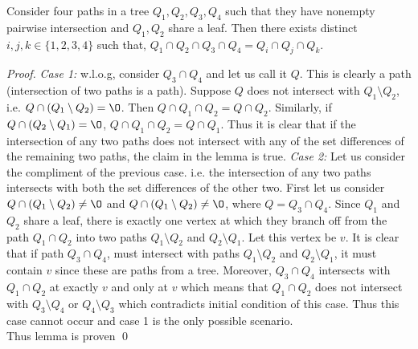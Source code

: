 \documentclass{llncs}
\begin{document}
\begin{lemma}
  \label{lem:fourpaths} Consider four paths in a tree $Q_1, Q_2, Q_3,
  Q_4$ such that they have nonempty pairwise intersection and $Q_1,
  Q_2$ share a leaf. Then there exists distinct $i, j, k \in \{1,2,3,4\}$ such that, $Q_1 \cap Q_2 \cap Q_3 \cap Q_4 = Q_i \cap
  Q_j \cap Q_k$.
\end{lemma}
\begin{proof}
  {\em Case 1:} w.l.o.g, consider $Q_3 \cap Q_4$ and let us call it $Q$. This is clearly a
  path (intersection of two paths is a path). 
  Suppose $Q$
  does not intersect with $Q_1 \setminus Q_2$, i.e. $Q \cap (Q_1
  \setminus Q_2) = \O$. Then $Q \cap
  Q_1 \cap Q_2 = Q \cap Q_2$. Similarly, if $Q \cap (Q_2 \setminus
  Q_1) = \O$, $Q \cap Q_1 \cap Q_2 = Q \cap Q_1$. Thus it is
  clear that if the intersection of any two paths does not intersect
  with any of the set differences of the remaining two paths, the
  claim in the lemma is true. 
  {\em Case 2:} Let us consider the compliment of the previous case. i.e. the
  intersection of any two paths intersects with both the set
  differences of the other two. First let us consider $Q \cap (Q_1 \setminus Q_2) \ne
  \O$ and $Q \cap (Q_1 \setminus Q_2) \ne \O$, where $Q = Q_3 \cap
  Q_4$. Since $Q_1$ and
  $Q_2$ share a leaf, there is exactly one vertex at which they branch
  off from the path $Q_1 \cap Q_2$ into two paths $Q_1 \setminus Q_2$
  and $Q_2 \setminus Q_1$. Let this vertex be $v$. It is clear that if
  path $Q_3 \cap Q_4$, must intersect with paths $Q_1 \setminus Q_2$
  and $Q_2 \setminus Q_1$, it must contain $v$ since these are paths
  from a tree. Moreover, $Q_3 \cap Q_4$ intersects with $Q_1 \cap
  Q_2$ at exactly $v$ and only at $v$ which means that $Q_1 \cap Q_2$
  does not intersect with $Q_3 \setminus Q_4$ or $Q_4 \setminus Q_3$
  which contradicts initial condition of this case. Thus this
  case cannot occur and case 1 is the only possible scenario. \\
  Thus lemma is proven \qed
\end{proof}
\end{document}
